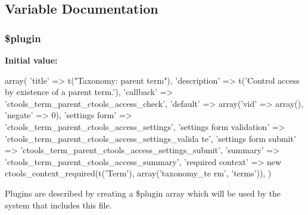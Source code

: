 \subsection{Variable Documentation}
\hypertarget{access_2term__parent_8inc_ada8a7130088351710bb02ed622d6bf65}{
\subsubsection[{\$plugin}]{\setlength{\rightskip}{0pt plus 5cm}\$plugin}}
\label{access_2term__parent_8inc_ada8a7130088351710bb02ed622d6bf65}
{\bfseries Initial value:}
\begin{DoxyCode}
 array(
  'title' => t("Taxonomy: parent term"),
  'description' => t('Control access by existence of a parent term.'),
  'callback' => 'ctools_term_parent_ctools_access_check',
  'default' => array('vid' => array(), 'negate' => 0),
  'settings form' => 'ctools_term_parent_ctools_access_settings',
  'settings form validation' => 'ctools_term_parent_ctools_access_settings_valida
      te',
  'settings form submit' => 'ctools_term_parent_ctools_access_settings_submit',
  'summary' => 'ctools_term_parent_ctools_access_summary',
  'required context' => new ctools_context_required(t('Term'), array('taxonomy_te
      rm', 'terms')),
)
\end{DoxyCode}
Plugins are described by creating a \$plugin array which will be used by the system that includes this file. 
